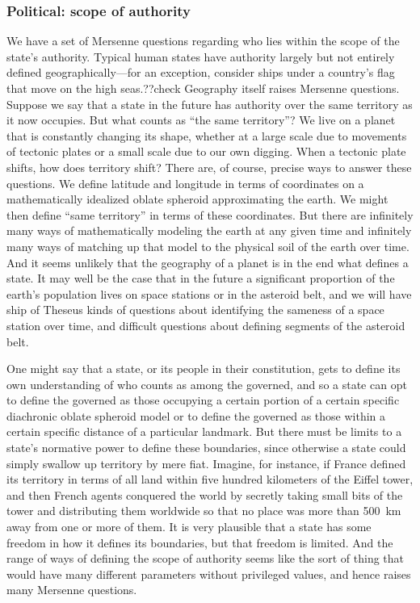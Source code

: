 \subsubsection{Political: scope of authority}
We have a set of Mersenne questions regarding who lies within the scope of the state's authority. Typical human states
have authority largely but not entirely defined geographically---for an exception, consider ships under a country's flag that
move on the high seas.??check Geography itself raises Mersenne questions. Suppose we say that a state in the future has authority
over the same territory as it now occupies. But what counts as ``the same territory''? We live on a planet that is constantly
changing its shape, whether at a large scale due to movements of tectonic plates or a small scale due to our own digging. When
a tectonic plate shifts, how does territory shift? There are, of course, precise ways to answer these questions. We define
latitude and longitude in terms of coordinates on a mathematically idealized oblate spheroid approximating the earth. We might
then define ``same territory'' in terms of these coordinates. But there are infinitely many ways of mathematically modeling the
earth at any given time and infinitely many ways of matching up that model to the physical soil of the earth over time.
And it seems unlikely that the geography of a planet is in the end what defines a state. It may well be the case that in the future 
a significant proportion of the earth's population lives on space stations or in the asteroid belt, and we will have ship of Theseus kinds of
questions about identifying the sameness of a space station over time, and difficult questions about defining segments of the asteroid
belt. 

One might say that a state, or its people in their constitution, gets to define 
its own understanding of who counts as among the governed, and so a state can opt to define the governed as those occupying a 
certain portion of a certain specific diachronic oblate spheroid model or to define the governed as those within a certain specific
distance of a particular landmark. But there must be limits to a state's normative power to define these boundaries, since otherwise
a state could simply swallow up territory by mere fiat. Imagine, for instance, if France defined its territory in terms of all land
within five hundred kilometers of the Eiffel tower, and then French agents conquered the world by secretly taking small bits
of the tower and distributing them worldwide so that no place was more than 500~km away from one or more of them. It is very plausible
that a state has some freedom in how it defines its boundaries, but that freedom is limited. And the range of ways of defining the
scope of authority seems like the sort of thing that would have many different parameters without privileged values, and hence 
raises many Mersenne questions.

